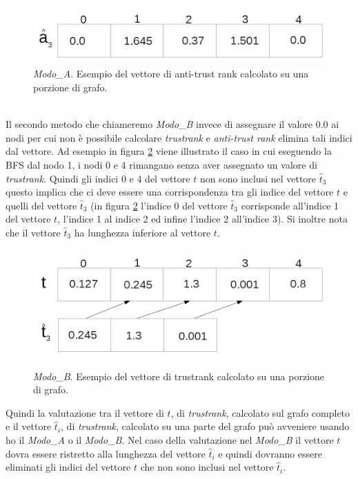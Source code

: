 \begin{figure}
\centering
 \includegraphics{immagini/test/aBFSmodoA}
 \caption{\textit{Modo\_A}. Esempio del vettore di anti-trust rank calcolato su una porzione di grafo.}
 \label{fig:aBFSmodoA}
\end{figure}
\\
Il secondo metodo che chiameremo \textit{Modo\_B} invece di assegnare il valore 0.0 ai nodi per cui non è possibile calcolare \textit{trustrank} e \textit{anti-trust rank} elimina tali indici dal vettore.  Ad esempio in figura \ref{fig:tBFSmodoB} viene illustrato il caso in cui eseguendo la BFS dal nodo 1, i nodi 0 e 4 rimangano senza aver assegnato un valore di \textit{trustrank}. Quindi gli indici 0 e 4 del vettore \(t\) non sono inclusi nel vettore \(\hat{t}_3\) questo implica che ci deve essere una corrispondenza tra gli indice del vettore \(t\) e quelli del vettore \(\hat{t}_3\) (in figura \ref{fig:tBFSmodoB} l'indice 0 del vettore \(\hat{t}_3\) corrisponde all'indice 1 del vettore \(t\), l'indice 1 al indice 2 ed infine l'indice 2 all'indice 3).  Si inoltre nota che il vettore \(\hat{t}_3\) ha lunghezza inferiore al vettore \(t\). 
\begin{figure}
\centering
 \includegraphics{immagini/test/tBFSmodoB}
 \caption{\textit{Modo\_B}. Esempio del vettore di trustrank calcolato su una porzione di grafo.}
 \label{fig:tBFSmodoB}
\end{figure}

Quindi la valutazione tra il vettore di \(t\), di \textit{trustrank}, calcolato sul grafo completo e il vettore \(\hat{t}_i\), di \textit{trustrank}, calcolato su una parte del grafo può avveniere usando ho il \textit{Modo\_A} o il \textit{Modo\_B}. Nel caso della valutazione nel \textit{Modo\_B} il vettore \(t\) dovra essere ristretto alla lunghezza del vettore \(\hat{t}_i\) e quindi dovranno essere eliminati gli indici del vettore \(t\) che non sono inclusi nel vettore \(\hat{t}_i\).

